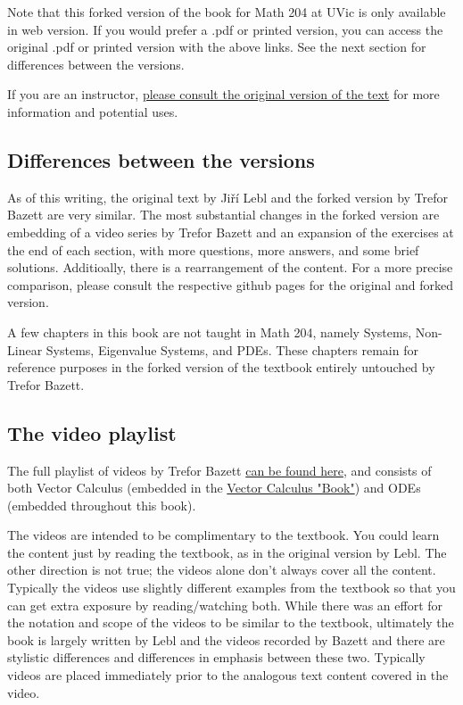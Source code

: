 Note that this forked version of the book for Math 204 at UVic is only available in web version. If you would prefer a .pdf or printed version, you can access the original .pdf or printed version with the above links. See the next section for differences between the versions.

If you are an instructor,  \href{https://www.jirka.org/diffyqs/html/notes_section.html}{please consult the original version of the text} for more information and potential uses.

\subsection{Differences between the versions}
As of this writing, the original text by Jiří Lebl and the forked version by Trefor Bazett are very similar. The most substantial changes in the forked version are embedding of a video series by Trefor Bazett and an expansion of the exercises at the end of each section, with more questions, more answers, and some brief solutions. Additioally, there is a rearrangement of the content. For a more precise comparison, please consult the respective github pages for the original and forked version. 

A few chapters in this book are not taught in Math 204, namely Systems, Non-Linear Systems, Eigenvalue Systems, and PDEs. These chapters remain for reference purposes in the forked version of the textbook entirely untouched by Trefor Bazett. 

\subsection{The video playlist}
The full playlist of videos by Trefor Bazett \href{https://www.youtube.com/playlist?list=PLQ9f-JfDG2WyBPsKFkkfszurhIYeKN6oX}{can be found here}, and consists of both Vector Calculus (embedded in the \href{https://web.uvic.ca/~tbazett/VectorCalculus/frontmatter-1.html}{Vector Calculus "Book"}) and ODEs (embedded throughout this book). 

The videos are intended to be complimentary to the textbook. You could learn the content just by reading the textbook, as in the original version by Lebl. The other direction is not true; the videos alone don't always
cover all the content. Typically the videos use slightly different examples from the textbook so that you can get extra exposure by reading/watching both. While there was an effort for the notation and scope of the videos to be similar to the textbook, ultimately the book is largely written by Lebl and the videos recorded by Bazett and there are stylistic differences and differences in emphasis between these two. Typically videos are placed immediately prior to the analogous text content covered in the video.

